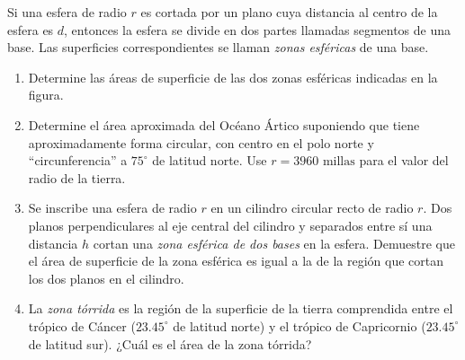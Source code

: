 \item Si una esfera de radio $r$ es cortada por un plano cuya distancia al centro de la esfera es $d$, entonces la esfera se divide en dos partes llamadas segmentos de una base. Las superficies correspondientes se llaman \textit{zonas esféricas} de una base.
    \begin{enumerate}
        \item[(a)] Determine las áreas de superficie de las dos zonas esféricas indicadas en la figura.
        \item[(b)] Determine el área aproximada del Océano Ártico suponiendo que tiene aproximadamente forma circular, con centro en el polo norte y ``circunferencia'' a $75^\circ$ de latitud norte. Use $r = 3960 \text{ millas}$ para el valor del radio de la tierra.
        \item[(c)] Se inscribe una esfera de radio $r$ en un cilindro circular recto de radio $r$. Dos planos perpendiculares al eje central del cilindro y separados entre sí una distancia $h$ cortan una \textit{zona esférica de dos bases} en la esfera. Demuestre que el área de superficie de la zona esférica es igual a la de la región que cortan los dos planos en el cilindro.
        \item[(d)] La \textit{zona tórrida} es la región de la superficie de la tierra comprendida entre el trópico de Cáncer ($23.45^\circ$ de latitud norte) y el trópico de Capricornio ($23.45^\circ$ de latitud sur). ¿Cuál es el área de la zona tórrida?
    \end{enumerate}
    
    \begin{center}
    \hspace{1cm}
    \end{center}
